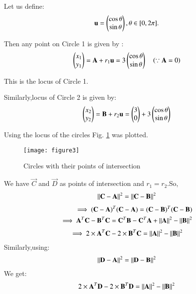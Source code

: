 \documentclass[journal,12pt,twocolumn]{IEEEtran}
\begin{document}
Let us define:
\begin{align}
\mathbf{u}=\begin{pmatrix}\cos \theta\\  \sin \theta\end{pmatrix},  \theta \in [0,2\pi].
\end{align}

Then any point  on Circle 1 is given by :
\begin{align}
\begin{pmatrix}x_{1}\\y_{1}\end{pmatrix}=\mathbf{A}+r_{1}\mathbf{u}=3\begin{pmatrix}\cos \theta\\ \sin \theta\end{pmatrix}\quad \left(\because \mathbf{A}=0\right)
\end{align}

 This is the locus of Circle 1.

Similarly,locus of Circle 2 is given by:
\begin{align}
\begin{pmatrix}x_{2}\\y_{2}\end{pmatrix}=\mathbf{B}+r_{2}\mathbf{u}=\begin{pmatrix}3\\0\end{pmatrix}+3\begin{pmatrix}\cos\theta\\  \sin \theta\end{pmatrix}
\end{align}

Using the locus of the circles Fig. \ref{fig:circle} was plotted.

\begin{figure}[H]
\centering
\texttt{[image: figure3]}
\caption{Circles with their points of intersection}
\label{fig:circle}	
\end{figure}

We have $\vec{C}$ and $\vec{D}$ as points of intersection and $r_{1}=r_{2}$.So,
\begin{align}
\lVert\mathbf{C}-\mathbf{A}\rVert^2 = \lVert\mathbf{C}-\mathbf{B}\rVert^2
\end{align}
\begin{align}
\implies(\mathbf{C}-\mathbf{A})^T(\mathbf{C}-\mathbf{A})=(\mathbf{C}-\mathbf{B})^T(\mathbf{C}-\mathbf{B})
\\
\implies \mathbf{A}^T\mathbf{C}-\mathbf{B}^T\mathbf{C}=\mathbf{C}^T\mathbf{B}-\mathbf{C}^T\mathbf{A}+\lVert\mathbf{A}\rVert^2-\lVert\mathbf{B}\rVert^2 
\end{align}
\begin{align}
\implies2\times \mathbf{A}^T\mathbf{C}-2\times\mathbf{B}^T\mathbf{C}=\lVert\mathbf{A}\rVert^2-\lVert\mathbf{B}\rVert^2 \label{eq:1}
\end{align}
Similarly,using:
\begin{align}
\lVert\mathbf{D}-\mathbf{A}\rVert^2 = \lVert\mathbf{D}-\mathbf{B}\rVert^2
\end{align}
We get:
\begin{align}
2\times \mathbf{A}^T\mathbf{D}-2\times\mathbf{B}^T\mathbf{D}=\lVert\mathbf{A}\rVert^2-\lVert\mathbf{B}\rVert^2 \label{eq:2}
\end{align}
\end{document}
